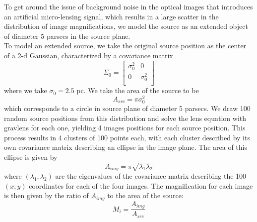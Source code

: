 \indent To get around the issue of background noise in the optical images that introduces an artificial micro-lensing signal, which results in a large scatter in the distribution of image magnifications, we model the source as an extended object of diameter 5 parsecs in the source plane.\\
\indent To model an extended source, we take the original source position as the center of a 2-d Gaussian, characterized by a covariance matrix
\[
\Sigma_0 = \begin{bmatrix}
\sigma_0^2 & 0 \\ 
0 & \sigma_0^2 \\
\end{bmatrix}
\]
where we take $\sigma_0 = 2.5$ pc. We take the area of the source to be 
\begin{equation}
\nonumber A_{src} = \pi \sigma_0^2
\end{equation}
which corresponds to a circle in source plane of diameter 5 parsecs. We draw 100 random source positions from this distribution and solve the lens equation with gravlens for each one, yielding 4 images positions for each source position. This process results in 4 clusters of 100 points each, with each cluster described by its own covariance matrix describing an ellipse in the image plane. The area of this ellipse is given by
\begin{equation}
\nonumber A_{img} = \pi \sqrt{\lambda_1 \lambda_2}
\end{equation}
where $\left(\lambda_1,\lambda_2\right)$ are the eigenvalues of the covariance matrix describing the 100 $\left(x,y\right)$ coordinates for each of the four images. The magnification for each image is then given by the ratio of $A_{img}$ to the area of the source:
\begin{equation}
\nonumber M_{i} = \frac{A_{img}}{A_{src}}
\end{equation}

